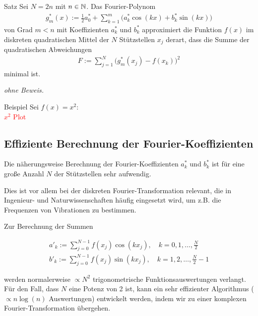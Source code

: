 \begin{colbox}{Satz}
  Sei $N=2n$ mit $n\in\mathbb N$. Das Fourier-Polynom
  \begin{align*}
  g_m^*(x) := \tfrac{1}{2}a^*_0 + \sum_{k=1}^{m}\Big(a^*_k\cos(kx)+b^*_k\sin(kx)\Big)
  \end{align*}
  von Grad $m<n$ mit Koeffizienten $a_k^*$ und $b^*_k$ approximiert die Funktion $f(x)$ im diskreten quadratischen 
  Mittel der $N$ Stützstellen $x_j$ derart, dass die Summe der quadratischen Abweichungen 
  \begin{align*}
    F:=\sum_{j=1}^{N}\Big(g^*_m(x_j)-f(x_k)\Big)^2
  \end{align*}
  minimal ist.
\end{colbox}
\textit{ohne Beweis.}


\begin{colbox}{Beispiel}
  Sei $f(x)=x^2$: \\
  \textcolor{red}{$x^2$ Plot} 
\end{colbox}

\subsection{Effiziente Berechnung der Fourier-Koeffizienten}
Die näherungsweise Berechnung der Fourier-Koeffizienten $a_k^*$ und $b_k^*$ ist für eine große Anzahl $N$ der 
Stützstellen sehr aufwendig. 

Dies ist vor allem bei der diskreten Fourier-Transformation relevant, die in Ingenieur- und Naturwissenschaften 
häufig eingesetzt wird, um z.B. die Frequenzen von Vibrationen zu bestimmen. 

Zur Berechnung der Summen 

%
\begin{align*}
  a'_k := \sum_{j=0}^{N-1} f(x_j)\cos(kx_j), \quad k=0,1,\dots,\tfrac{N}{2} \\
  b'_k := \sum_{j=0}^{N-1} f(x_j)\sin(kx_j), \quad k=1,2,\dots,\tfrac{N}{2}-1 
  \tag{1}\label{eq:fftEQ1}
\end{align*}
%

werden normalerweise $\propto N^2$ trigonometrische Funktionsauswertungen verlangt. Für den Fall, dass $N$ eine 
Potenz von 2 ist, kann ein sehr effizienter Algorithmus ($\propto n\log(n)$ Auswertungen) entwickelt werden, 
indem wir zu einer komplexen Fourier-Transformation übergehen.


